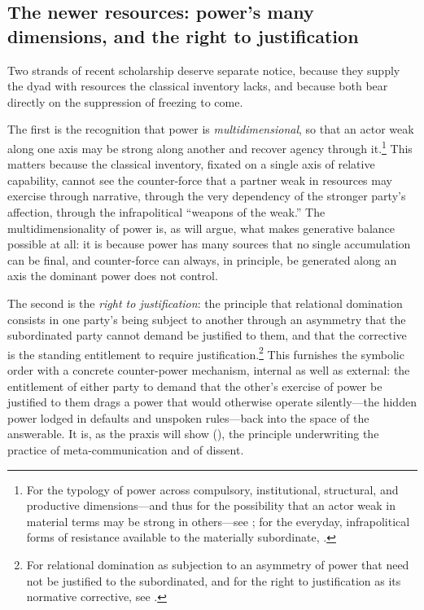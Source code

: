 \subsection{The newer resources: power's many dimensions, and the right to justification}
\label{p17:sub:practices-newer}

Two strands of recent scholarship deserve separate notice, because they supply the dyad with resources the classical inventory lacks, and because both bear directly on the suppression of freezing to come.

The first is the recognition that power is \emph{multidimensional}, so that an actor weak along one axis may be strong along another and recover agency through it.\footnote{For the typology of power across compulsory, institutional, structural, and productive dimensions---and thus for the possibility that an actor weak in material terms may be strong in others---see \textcite{barnett2005}; for the everyday, infrapolitical forms of resistance available to the materially subordinate, \textcite{scott1985}.} This matters because the classical inventory, fixated on a single axis of relative capability, cannot see the counter-force that a partner weak in resources may exercise through narrative, through the very dependency of the stronger party's affection, through the infrapolitical ``weapons of the weak.'' The multidimensionality of power is, as  will argue, what makes generative balance possible at all: it is because power has many sources that no single accumulation can be final, and counter-force can always, in principle, be generated along an axis the dominant power does not control.

The second is the \emph{right to justification}: the principle that relational domination consists in one party's being subject to another through an asymmetry that the subordinated party cannot demand be justified to them, and that the corrective is the standing entitlement to require justification.\footnote{For relational domination as subjection to an asymmetry of power that need not be justified to the subordinated, and for the right to justification as its normative corrective, see \textcite{forst2012}.} This furnishes the symbolic order with a concrete counter-power mechanism, internal as well as external: the entitlement of either party to demand that the other's exercise of power be justified to them drags a power that would otherwise operate silently---the hidden power lodged in defaults and unspoken rules---back into the space of the answerable. It is, as the praxis will show (), the principle underwriting the practice of meta-communication and of dissent.

